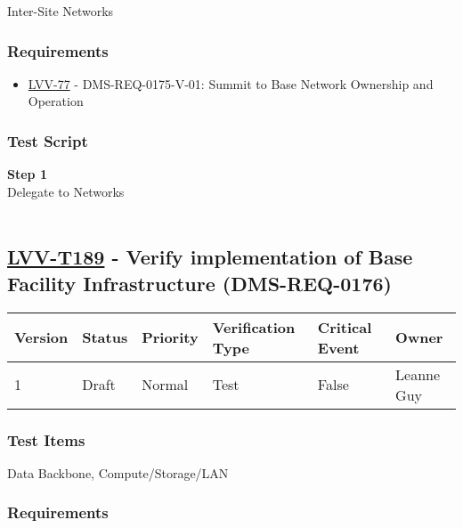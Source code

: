 Inter-Site Networks~

\hypertarget{requirements-165}{%
\subsubsection{Requirements}\label{requirements-165}}

\begin{itemize}
\tightlist
\item
  \href{https://jira.lsstcorp.org/browse/LVV-77}{LVV-77} -
  DMS-REQ-0175-V-01: Summit to Base Network Ownership and Operation
\end{itemize}

\hypertarget{test-script-165}{%
\subsubsection{Test Script}\label{test-script-165}}

\textbf{Step 1}\\
Delegate to Networks\\
~\\

\hypertarget{lvv-t189---verify-implementation-of-base-facility-infrastructure-dms-req-0176}{%
\subsection{\texorpdfstring{\href{https://jira.lsstcorp.org/secure/Tests.jspa\#/testCase/LVV-T189}{LVV-T189}
- Verify implementation of Base Facility Infrastructure
(DMS-REQ-0176)}{LVV-T189 - Verify implementation of Base Facility Infrastructure (DMS-REQ-0176)}}\label{lvv-t189---verify-implementation-of-base-facility-infrastructure-dms-req-0176}}

\begin{longtable}[]{@{}llllll@{}}
\toprule
Version & Status & Priority & Verification Type & Critical Event &
Owner\tabularnewline
\midrule
\endhead
1 & Draft & Normal & Test & False & Leanne Guy\tabularnewline
\bottomrule
\end{longtable}

\hypertarget{test-items-165}{%
\subsubsection{Test Items}\label{test-items-165}}

Data Backbone, Compute/Storage/LAN~

\hypertarget{requirements-166}{%
\subsubsection{Requirements}\label{requirements-166}}


